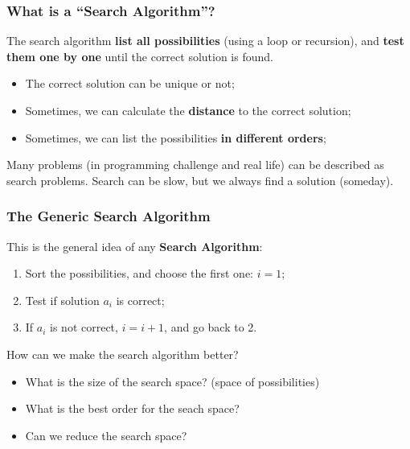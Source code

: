 \begin{frame}
  \frametitle{What is a ``Search Algorithm''?}
    The search algorithm {\bf list all possibilities} (using a loop or recursion), and
    {\bf test them one by one} until the correct solution is found.\bigskip

    \begin{itemize}
      \item The correct solution can be unique or not;\smallskip

      \item Sometimes, we can calculate the {\bf distance} to the correct solution;\smallskip

      \item Sometimes, we can list the possibilities {\bf in different orders};
    \end{itemize}
    \bigskip

    Many problems (in programming challenge and real life) can be described as
    search problems. Search can be slow, but we always find a solution (someday).
\end{frame}



\begin{frame}
  \frametitle{The Generic Search Algorithm}
  This is the general idea of any {\bf Search Algorithm}:\smallskip
  \begin{enumerate}
    \item Sort the possibilities, and choose the first one: $i = 1$;
    \item Test if solution $a_i$ is correct;
    \item If $a_i$ is not correct, $i = i+1$, and go back to 2.
  \end{enumerate}\bigskip

  How can we make the search algorithm better?
  \begin{itemize}
  \item What is the size of the search space? (space of possibilities)
  \item What is the best order for the seach space?
  \item Can we reduce the search space?
  \end{itemize}
\end{frame}

